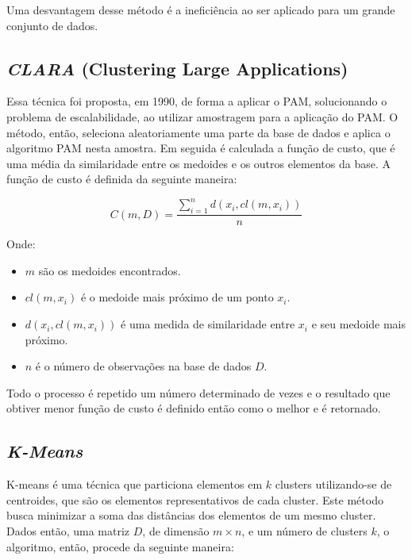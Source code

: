 \documentclass[12pt,a4paper,header]{abnt}
\begin{document}
Uma desvantagem desse método é a ineficiência ao ser aplicado para um grande conjunto de dados\cite{park2009simple}.

\subsection{\textit{CLARA} (Clustering Large Applications)}

Essa técnica foi proposta, em 1990, de forma a aplicar o PAM, solucionando o problema de escalabilidade, ao utilizar amostragem para a aplicação do PAM\cite{park2009simple}. O método, então, seleciona aleatoriamente uma parte da base de dados e aplica o algoritmo PAM nesta amostra. Em seguida é calculada a função de custo, que é uma média da similaridade entre os medoides e os outros elementos da base\cite{bhat2014k}. A função de custo é definida da seguinte maneira:

\begin{equation}
C(m, D) = \frac{\sum_{i=1}^{n}{d(x_i, cl(m, x_i))}}{n}
\end{equation}

Onde:

\begin{itemize}

\item{$m$ são os medoides encontrados.}
\item{$cl(m,  x_i)$ é o medoide mais próximo de um ponto $x_i$.}
\item{$d(x_i, cl(m, x_i))$ é uma medida de similaridade entre $x_i$ e seu medoide mais próximo.}
\item{$n$ é o número de observações na base de dados $D$.}

\end{itemize}

Todo o processo é repetido um número determinado de vezes e o resultado que obtiver menor função de custo é definido então como o melhor e é retornado\cite{bhat2014k}.

\subsection{\textit{K-Means}}

K-means é uma técnica que particiona elementos em $k$ clusters utilizando-se de centroides, que são os elementos representativos de cada cluster. Este método busca minimizar a soma das distâncias dos elementos de um mesmo cluster. Dados então, uma matriz $D$, de dimensão $m \times n$, e um número de clusters $k$, o algoritmo, então, procede da seguinte maneira\cite{mining2006data}:
\end{document}

